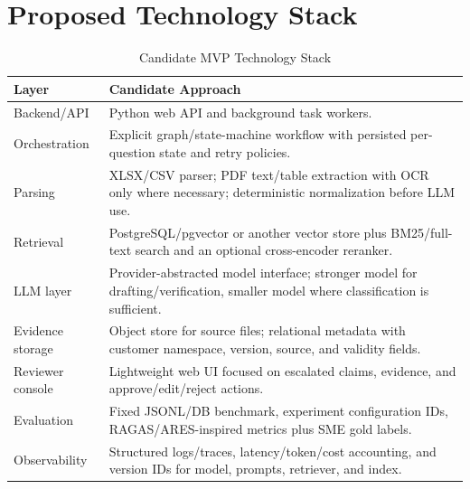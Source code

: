 \documentclass[11pt,journal,onecolumn]{IEEEtran}
\begin{document}
\section{Proposed Technology Stack}
\begin{table}[H]
\centering
\caption{Candidate MVP Technology Stack}
\small
\begin{tabularx}{\textwidth}{L{0.21\textwidth}Y}
\toprule
\textbf{Layer} & \textbf{Candidate Approach} \\
\midrule
Backend/API & Python web API and background task workers. \\
Orchestration & Explicit graph/state-machine workflow with persisted per-question state and retry policies. \\
Parsing & XLSX/CSV parser; PDF text/table extraction with OCR only where necessary; deterministic normalization before LLM use. \\
Retrieval & PostgreSQL/pgvector or another vector store plus BM25/full-text search and an optional cross-encoder reranker. \\
LLM layer & Provider-abstracted model interface; stronger model for drafting/verification, smaller model where classification is sufficient. \\
Evidence storage & Object store for source files; relational metadata with customer namespace, version, source, and validity fields. \\
Reviewer console & Lightweight web UI focused on escalated claims, evidence, and approve/edit/reject actions. \\
Evaluation & Fixed JSONL/DB benchmark, experiment configuration IDs, RAGAS/ARES-inspired metrics plus SME gold labels. \\
Observability & Structured logs/traces, latency/token/cost accounting, and version IDs for model, prompts, retriever, and index. \\
\bottomrule
\end{tabularx}
\end{table}

\end{document}
